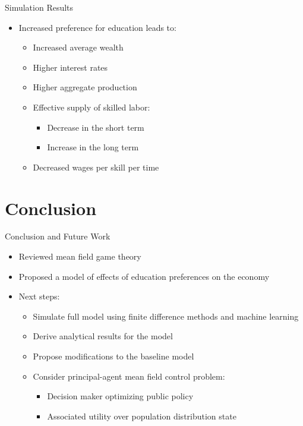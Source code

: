 \documentclass[xcolor=dvipsnames,t,aspectratio=170]{beamer} %
\begin{document}
\begin{frame}{Simulation Results}
\begin{itemize}
    \item Increased preference for education leads to:
    \begin{itemize}
        \item Increased average wealth
        \item Higher interest rates
        \item Higher aggregate production
        \item Effective supply of skilled labor:
        \begin{itemize}
            \item Decrease in the short term
            \item Increase in the long term
        \end{itemize}
        \item Decreased wages per skill per time
    \end{itemize}
\end{itemize}
\end{frame}

\section{Conclusion}

\begin{frame}{Conclusion and Future Work}
\begin{itemize}
    \item Reviewed mean field game theory
    \item Proposed a model of effects of education preferences on the economy
    \item Next steps:
    \begin{itemize}
        \item Simulate full model using finite difference methods and machine learning
        \item Derive analytical results for the model
        \item Propose modifications to the baseline model
        \item Consider principal-agent mean field control problem:
        \begin{itemize}
            \item Decision maker optimizing public policy
            \item Associated utility over population distribution state
        \end{itemize}
    \end{itemize}
\end{itemize}
\end{frame}
\end{document}
